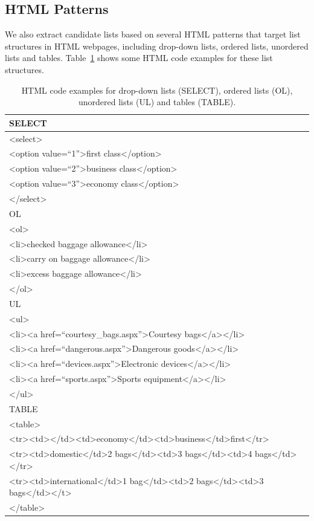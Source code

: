 \subsection{HTML Patterns}
We also extract candidate lists based on several HTML patterns that target list structures in HTML webpages, including drop-down lists, ordered lists, unordered lists and tables. Table~\ref{tab:facet-html} shows some HTML code examples for these list structures.
\begin{table}[ht!]
\centering
\caption{HTML code examples for drop-down lists (SELECT), ordered lists (OL), unordered lists (UL) and tables (TABLE).} 
\label{tab:facet-html}
\begin{tabular}{|l|} \hline
SELECT \\\hline
<select>\\
<option value=``1''>first class</option>\\
<option value=``2''>business class</option>\\
<option value=``3''>economy class</option>\\
</select>\\\hline
OL \\\hline
<ol>\\
<li>checked baggage allowance</li>\\
<li>carry on baggage allowance</li>\\
<li>excess baggage allowance</li>\\
</ol>\\\hline
UL \\\hline
<ul> \\
<li><a href=``courtesy\_bags.aspx''>Courtesy bags</a></li>\\
<li><a href=``dangerous.aspx''>Dangerous goods</a></li>\\
<li><a href=``devices.aspx''>Electronic devices</a></li>\\
<li><a href=``sports.aspx''>Sports equipment</a></li>\\
</ul>\\\hline
TABLE \\\hline
<table>\\
\small{<tr><td></td><td>economy</td><td>business</td>first</tr>}\\
\small{<tr><td>domestic</td>2 bags</td><td>3 bags</td><td>4 bags</td></tr>}\\
\small{<tr><td>international</td>1 bag</td><td>2 bags</td><td>3 bags</td></t>}\\
</table>\\\hline
\end{tabular}
\end{table}

